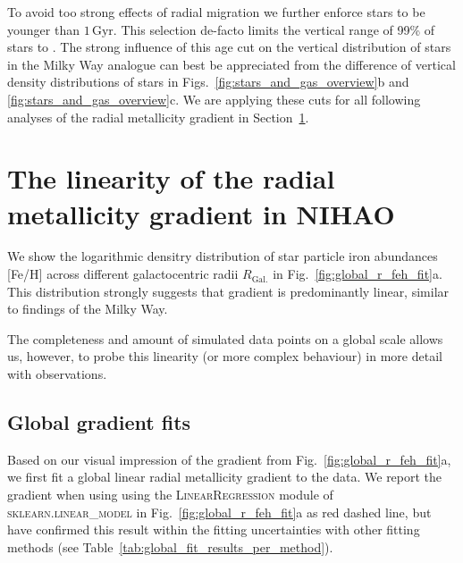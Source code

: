 \documentclass[fleqn,usenatbib]{mnras}
\begin{document}
To avoid too strong effects of radial migration \citep{Binney2008, Frankel2018} we further enforce stars to be younger than $1\,\mathrm{Gyr}$. This selection de-facto limits the vertical range of 99\% of stars to . The strong influence of this age cut on the vertical distribution of stars in the Milky Way analogue can best be appreciated from the difference of vertical density distributions of stars in Figs.~\ref{fig:stars_and_gas_overview}b and \ref{fig:stars_and_gas_overview}c. We are applying these cuts for all following analyses of the radial metallicity gradient in Section~\ref{sec:linear_radial_metallicity_gradients}.

\section{The linearity of the radial metallicity gradient in NIHAO}
\label{sec:linear_radial_metallicity_gradients}

We show the logarithmic densitry distribution of star particle iron abundances [Fe/H] across different galactocentric radii $R_\mathrm{Gal.}$ in Fig.~\ref{fig:global_r_feh_fit}a. This distribution strongly suggests that gradient is predominantly linear, similar to findings of the Milky Way.

The completeness and amount of simulated data points on a global scale allows us, however, to probe this linearity (or more complex behaviour) in more detail with observations.

\subsection{Global gradient fits}



Based on our visual impression of the gradient from Fig.~\ref{fig:global_r_feh_fit}a, we first fit a global linear radial metallicity gradient to the data. We report the gradient when using using the \textsc{LinearRegression} module of \textsc{sklearn.linear\_model} \citep{scikit-learn} in Fig.~\ref{fig:global_r_feh_fit}a as red dashed line, but have confirmed this result within the fitting uncertainties with other fitting methods (see Table~\ref{tab:global_fit_results_per_method}).
\end{document}
